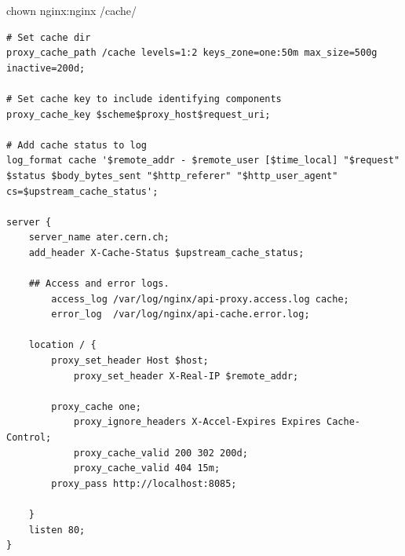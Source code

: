 chown nginx:nginx /cache/

\begin{verbatim}
# Set cache dir
proxy_cache_path /cache levels=1:2 keys_zone=one:50m max_size=500g inactive=200d;

# Set cache key to include identifying components
proxy_cache_key $scheme$proxy_host$request_uri;

# Add cache status to log
log_format cache '$remote_addr - $remote_user [$time_local] "$request" $status $body_bytes_sent "$http_referer" "$http_user_agent" cs=$upstream_cache_status';

server {
	server_name ater.cern.ch;
	add_header X-Cache-Status $upstream_cache_status;
	
	## Access and error logs.
		access_log /var/log/nginx/api-proxy.access.log cache;
		error_log  /var/log/nginx/api-cache.error.log;	
	
	location / {
		proxy_set_header Host $host;
			proxy_set_header X-Real-IP $remote_addr;
			
		proxy_cache one;
			proxy_ignore_headers X-Accel-Expires Expires Cache-Control;
			proxy_cache_valid 200 302 200d;
			proxy_cache_valid 404 15m;
		proxy_pass http://localhost:8085;	
	
	}
	listen 80;
}
\end{verbatim}